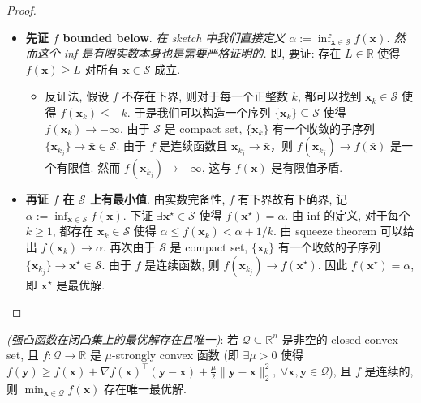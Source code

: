\begin{thmblock}[{Weierstrass}]
\begin{proof}{}
\begin{quote}
\end{quote}

\begin{itemize}
\item {}\textbf{先证 $f$ bounded below}. \emph{在 sketch 中我们直接定义 $\alpha := \inf_{\bm{x} \in \mathcal{S}} f(\bm{x})$. 然而这个 inf 是有限实数本身也是需要严格证明的.} 即, 要证: 存在 $L \in \mathbb{R}$ 使得 $f(\bm{x}) \geq L$ 对所有 $\bm{x} \in \mathcal{S}$ 成立.

\begin{itemize}
\item {}反证法, 假设 $f$ 不存在下界, 则对于每一个正整数 $k$, 都可以找到 $\bm{x}_k \in \mathcal{S}$ 使得 $f(\bm{x}_k) \leq -k$. 于是我们可以构造一个序列 $\{\bm{x}_k\} \subseteq \mathcal{S}$ 使得 $f(\bm{x}_k) \to -\infty$. 由于 $\mathcal{S}$ 是 compact set, $\{\bm{x}_k\}$ 有一个收敛的子序列 $\{\bm{x}_{k_j}\} \to \bar{\bm{x}} \in \mathcal{S}$. 由于 $f$ 是连续函数且 $\bm{x}_{k_j} \to \bar{\bm{x}}$，则 $f(\bm{x}_{k_j}) \to f(\bar{\bm{x}})$ 是一个有限值. 然而 $f(\bm{x}_{k_j}) \to -\infty$, 这与 $f(\bar{\bm{x}})$ 是有限值矛盾.


\end{itemize}


\item {}\textbf{再证 $f$ 在 $\mathcal{S}$ 上有最小值}. 由实数完备性, $f$ 有下界故有下确界, 记 $\alpha := \inf_{\bm{x} \in \mathcal{S}} f(\bm{x})$. 下证 $\exists \bm{x}^\star \in \mathcal{S}$ 使得 $f(\bm{x}^\star) = \alpha$. 由 inf 的定义, 对于每个 $k \geq 1$, 都存在 $\bm{x}_k \in \mathcal{S}$ 使得 $\alpha \leq f(\bm{x}_k) < \alpha + 1/k$. 由 squeeze theorem 可以给出 $f(\bm{x}_k) \to \alpha$. 再次由于 $\mathcal{S}$ 是 compact set, $\{\bm{x}_k\}$ 有一个收敛的子序列 $\{\bm{x}_{k_j}\} \to \bm{x}^\star \in \mathcal{S}$. 由于 $f$ 是连续函数, 则 $f(\bm{x}_{k_j}) \to f(\bm{x}^\star)$. 因此 $f(\bm{x}^\star) = \alpha$, 即 $\bm{x}^\star$ 是最优解.


\end{itemize}

\end{proof}

\end{thmblock}


\begin{colblock} \emph{(强凸函数在闭凸集上的最优解存在且唯一)}: 若 $\mathcal{Q} \subseteq \mathbb{R}^n$ 是非空的 closed convex set, 且 $f: \mathcal{Q} \to \mathbb{R}$ 是 $\mu$-strongly convex 函数 (即 $\exists \mu > 0$ 使得 $f(\bm{y}) \geq f(\bm{x}) + \nabla f(\bm{x})^\top (\bm{y}-\bm{x}) + \frac{\mu}{2}\|\bm{y}-\bm{x}\|_2^2,~ \forall \bm{x}, \bm{y} \in \mathcal{Q}$), 且 $f$ 是连续的, 则 $\min_{\bm{x} \in \mathcal{Q}} f(\bm{x})$ 存在唯一最优解.

\end{colblock}

